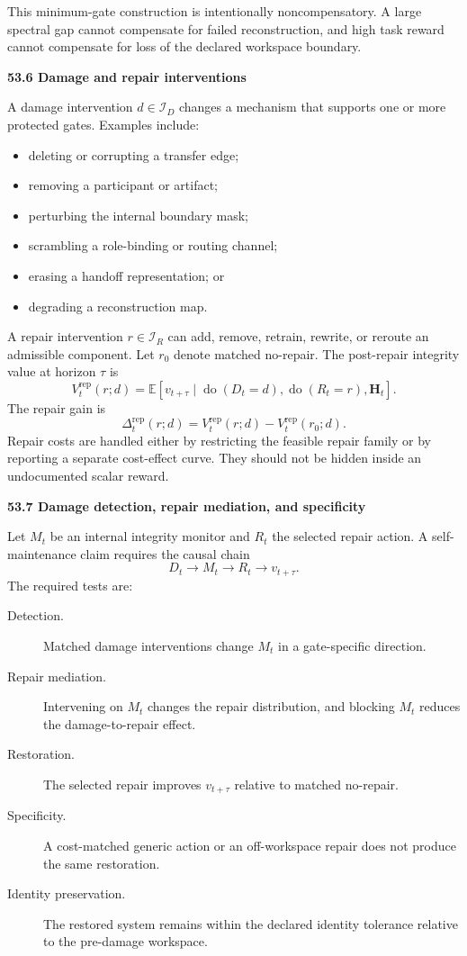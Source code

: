 \documentclass[11pt,letterpaper]{article}
\newcommand{\subtopic}[1]{%
 \vspace{0.45em}
 {\bfseries\color{AccentColor} #1\par}
}
\theoremstyle{plain}
\theoremstyle{definition}
\begin{document}
This minimum-gate construction is intentionally noncompensatory. A large
spectral gap cannot compensate for failed reconstruction, and high task reward
cannot compensate for loss of the declared workspace boundary.

\subtopic{53.6 Damage and repair interventions}

A damage intervention \(d\in\mathcal I_D\) changes a mechanism that supports
one or more protected gates. Examples include:
\begin{itemize}
\item deleting or corrupting a transfer edge;
\item removing a participant or artifact;
\item perturbing the internal boundary mask;
\item scrambling a role-binding or routing channel;
\item erasing a handoff representation; or
\item degrading a reconstruction map.
\end{itemize}

A repair intervention \(r\in\mathcal I_R\) can add, remove, retrain, rewrite,
or reroute an admissible component. Let \(r_0\) denote matched no-repair. The
post-repair integrity value at horizon \(\tau\) is
\[
V_t^{\mathrm{rep}}(r;d)
=
\mathbb E
\left[
v_{t+\tau}
\mid
\operatorname{do}(D_t=d),
\operatorname{do}(R_t=r),
\mathbf H_t
\right].
\]
The repair gain is
\[
\Delta_t^{\mathrm{rep}}(r;d)
=
V_t^{\mathrm{rep}}(r;d)
-
V_t^{\mathrm{rep}}(r_0;d).
\]
Repair costs are handled either by restricting the feasible repair family or
by reporting a separate cost-effect curve. They should not be hidden inside
an undocumented scalar reward.

\subtopic{53.7 Damage detection, repair mediation, and specificity}

Let \(M_t\) be an internal integrity monitor and \(R_t\) the selected repair
action. A self-maintenance claim requires the causal chain
\[
D_t
\longrightarrow
M_t
\longrightarrow
R_t
\longrightarrow
v_{t+\tau}.
\]
The required tests are:
\begin{description}
\item[Detection.]
Matched damage interventions change \(M_t\) in a gate-specific direction.

\item[Repair mediation.]
Intervening on \(M_t\) changes the repair distribution, and blocking \(M_t\)
reduces the damage-to-repair effect.

\item[Restoration.]
The selected repair improves \(v_{t+\tau}\) relative to matched no-repair.

\item[Specificity.]
A cost-matched generic action or an off-workspace repair does not produce the
same restoration.

\item[Identity preservation.]
The restored system remains within the declared identity tolerance relative to
the pre-damage workspace.
\end{description}
\end{document}
